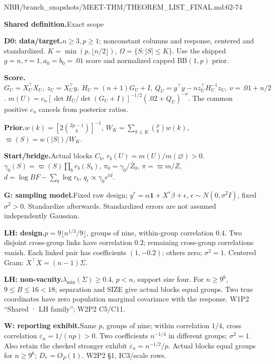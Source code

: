 \begin{stmt}{NBH/branch_snapshots/MEET-THM/THEOREM_LIST_FINAL.md:62-74}
\par\smallskip\noindent\textbf{Shared definition.}\enspace Exact scope
\par\smallskip\noindent\textbf{D0: data/target.}\enspace \(n\ge3,p\ge1\); nonconstant columns and response, centered and standardized. \(K=\min(p,\lfloor n/2\rfloor)\), \(\Omega=\{S:|S|\le K\}\). Use the shipped \(g=n,\tau=1,a_0=b_0=.01\) score and normalized capped BB\((1,p)\) prior.
\par\smallskip\noindent\textbf{Score.}\enspace \(G_U=X_U^\top X_U,\ z_U=X_U^\top y,\ H_U=(n+1)G_U+I,\ Q_U=y^\top y-nz_U^\top H_U^{-1}z_U,\ \nu=.01+n/2\). \(m(U)=c_n[\det H_U/\det(G_U+I)]^{-1/2}(.02+Q_U)^{-\nu}\). The common positive \(c_n\) cancels from posterior ratios.
\par\smallskip\noindent\textbf{Prior.}\enspace \(w(k)=[2\binom{2p-1}{k}]^{-1}\), \(W_K=\sum_{k\le K}\binom pk w(k)\), \(\varpi(S)=w(|S|)/W_K\).
\par\smallskip\noindent\textbf{Start/bridge.}\enspace Actual blocks \(C_b\), \(r_b(U)=m(U)/m(\varnothing)>0\). \(\gamma_0(S)=\varpi(S)\prod_b r_b(S_b)\), \(\pi_0=\gamma_0/\bar Z_0\), \(\pi=\varpi m/Z\), \(d=\log BF-\sum_b\log r_b\), \(q_t\propto\gamma_0e^{td}\).
\par\smallskip\noindent\textbf{G: sampling model.}\enspace Fixed raw design; \(y^r=\alpha\mathbf1+X^r\beta+\epsilon\), \(\epsilon\sim N(0,\sigma^2I)\), fixed \(\sigma^2>0\). Standardize afterwards. Standardized errors are not assumed independently Gaussian.
\par\smallskip\noindent\textbf{LH: design.}\enspace \(p=9\lfloor n^{1/3}/9\rfloor\), groups of nine, within-group correlation \(0.4\). Two disjoint cross-group links have correlation \(0.2\); remaining cross-group correlations vanish. Each linked pair has coefficients \((1,-0.2)\); others zero; \(\sigma^2=1\). Centered Gram: \(X^\top X=(n-1)\Sigma\).
\par\smallskip\noindent\textbf{LH: non-vacuity.}\enspace \(\lambda_{\min}(\Sigma)\ge0.4\), \(p<n\), support size four. For \(n\ge9^6\), \(9\le B\le16<18\); separation and SIZE give actual blocks equal groups. Two true coordinates have zero population marginal covariance with the response. W1P2 “Shared · LH family”; W2P2 C5/C11.
\par\smallskip\noindent\textbf{W: reporting exhibit.}\enspace Same \(p\), groups of nine; within correlation \(1/4\), cross correlation \(\varepsilon_n=1/(np)>0\). Two coefficients \(n^{-1/4}\) in different groups; \(\sigma^2=1\). Also retain the checked stronger exhibit \(\varepsilon_n=n^{-1/2}/p\). Actual blocks equal groups for \(n\ge9^6\); \(D_*=O_P(1)\). W2P2 §1, IC3/scale rows.

\end{stmt}
